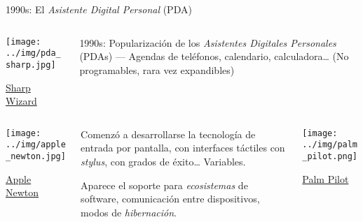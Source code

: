 \documentclass[presentation]{beamer}
\begin{document}
\begin{frame}[label={sec:orged79a9b}]{1990s: El \emph{Asistente Digital Personal} (PDA)}
\begin{columns} \begin{column}{0.15\textwidth}
\begin{center}
\texttt{[image: ../img/pda\_sharp.jpg]}
\end{center}
{\tiny \href{https://en.wikipedia.org/wiki/Sharp_Wizard#/media/File:SharpElectronicOrganiser-open.jpg}{Sharp Wizard}}
\end{column} \begin{column}{0.8\textwidth}
1990s: Popularización de los \emph{Asistentes Digitales Personales} (PDAs)
— Agendas de teléfonos, calendario, calculadora\ldots{} (No programables,
rara vez expandibles)
\end{column} \end{columns}

\begin{columns} \begin{column}{0.15\textwidth}
\begin{center}
\texttt{[image: ../img/apple\_newton.jpg]}
\end{center}
{\tiny \href{https://en.wikipedia.org/wiki/Apple_Newton#/media/File:Apple_Newton-IMG_0454-cropped.jpg}{Apple Newton}}
\end{column} \begin{column}{0.6\textwidth}
Comenzó a desarrollarse la tecnología de entrada por pantalla, con
interfaces táctiles con \emph{stylus}, con grados de éxito\ldots{} Variables.

Aparece el soporte para \emph{ecosistemas} de software, comunicación entre
dispositivos, modos de \emph{hibernación}.
\end{column} \begin{column}{0.15\textwidth}
\begin{center}
\texttt{[image: ../img/palm\_pilot.png]}
\end{center}
{\tiny \href{https://en.wikipedia.org/wiki/Palm_(PDA)}{Palm Pilot}}
\end{column} \end{columns}
\end{frame}
\end{document}
